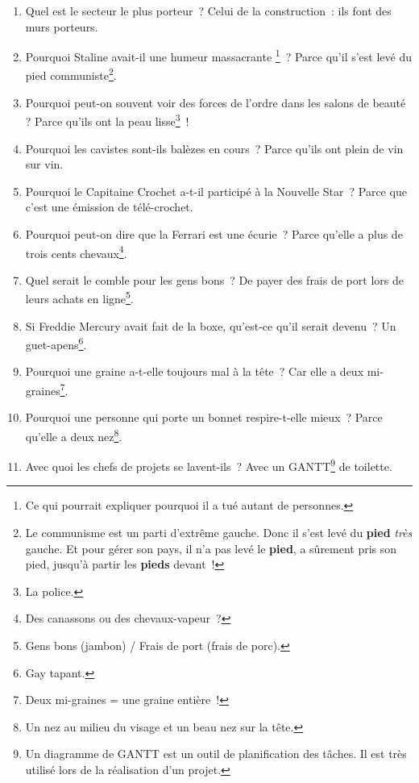 \documentclass[10pt,a5paper,fullpage]{book}
\begin{document}
\begin{enumerate}
		\item Quel est le secteur le plus porteur~? Celui de la construction~: ils font des murs porteurs.
		\item Pourquoi Staline avait-il une humeur massacrante \footnote{Ce qui pourrait expliquer pourquoi il a tué autant de personnes.}~? Parce qu’il s’est levé du pied communiste\footnote{Le communisme est un parti d'extrême gauche. Donc il s'est levé du \textbf{pied} \textit{très} gauche. Et pour gérer son pays, il n'a pas levé le \textbf{pied}, a sûrement pris son pied, jusqu'à partir les \textbf{pieds} devant~!}.
		\item Pourquoi peut-on souvent voir des forces de l'ordre dans les salons de beauté ? Parce qu'ils ont la peau lisse\footnote{La police.}~!
		\item Pourquoi les cavistes sont-ils balèzes en cours~? Parce qu’ils ont plein de vin sur vin. 
		\item Pourquoi le Capitaine Crochet a-t-il participé à la Nouvelle Star~? Parce que c’est une émission de télé-crochet.
		\item Pourquoi peut-on dire que la Ferrari est une écurie~? Parce qu’elle a plus de trois cents chevaux\footnote{Des canassons ou des chevaux-vapeur~?}.
		\item Quel serait le comble pour les gens bons~? De payer des frais de port lors de leurs achats en ligne\footnote{Gens bons (jambon) / Frais de port (frais de porc).}.
		\item Si Freddie Mercury avait fait de la boxe, qu’est-ce qu’il serait devenu~? Un guet-apens\footnote{Gay tapant.}.
		\item Pourquoi une graine a-t-elle toujours mal à la tête~? Car elle a deux mi-graines\footnote{Deux mi-graines = une graine entière~!}.
		\item Pourquoi une personne qui porte un bonnet respire-t-elle mieux~? Parce qu’elle a deux nez\footnote{Un nez au milieu du visage et un beau nez sur la tête.}.
		\item Avec quoi les chefs de projets se lavent-ils~? Avec un GANTT\footnote{Un diagramme de GANTT est un outil de planification des tâches. Il est très utilisé lors de la réalisation d’un projet.} de toilette.  

\end{enumerate}
\end{document}
